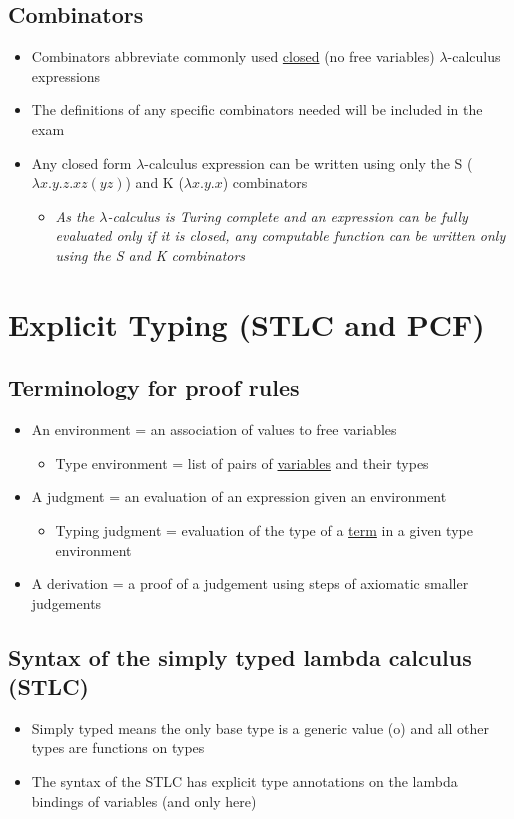 \documentclass[20pt,a4paper,landscape]{extarticle}
\begin{document}
\begin{flushleft}
\subsection{Combinators}
\begin{itemize}
\item Combinators abbreviate commonly used \underline{closed} (no free variables) $\lambda$-calculus expressions
\item The definitions of any specific combinators needed will be included in the exam
\item Any closed form $\lambda$-calculus expression can be written using only the S ($\lambda x.y.z. x z (y z)$)  and K ($\lambda x.y. x$) combinators
    \begin{itemize}
        \item \textit{As the $\lambda$-calculus is Turing complete and an expression can be fully evaluated only if it is closed, any computable function can be written only using the S and K combinators}
    \end{itemize}
\end{itemize}
\clearpage
\section{Explicit Typing (STLC and PCF)}
\subsection{Terminology for proof rules}
\begin{itemize}
\item An environment = an association of values to free variables
    \begin{itemize}
        \item Type environment = list of pairs of \underline{variables} and their types
    \end{itemize}
\item A judgment = an evaluation of an expression given an environment
    \begin{itemize}
        \item Typing judgment = evaluation of the type of a \underline{term} in a given type environment
    \end{itemize}
\item A derivation = a proof of a judgement using steps of axiomatic smaller judgements
\end{itemize}
\subsection{Syntax of the simply typed lambda calculus (STLC)}
\begin{itemize}
\item Simply typed means the only base type is a generic value (o) and all other types are functions on types
\item The syntax of the STLC has explicit type annotations on the lambda bindings of variables (and only here)
\end{itemize}
\clearpage

\end{flushleft}
\end{document}

